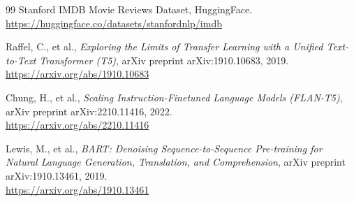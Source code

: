 \begin{thebibliography}{99}
    Stanford IMDB Movie Reviews Dataset, HuggingFace.\\
    \href{https://huggingface.co/datasets/stanfordnlp/imdb}{https://huggingface.co/datasets/stanfordnlp/imdb}

    Raffel, C., et al., \textit{Exploring the Limits of Transfer Learning with a Unified Text-to-Text Transformer (T5)}, arXiv preprint arXiv:1910.10683, 2019.\\
    \href{https://arxiv.org/abs/1910.10683}{https://arxiv.org/abs/1910.10683}

    Chung, H., et al., \textit{Scaling Instruction-Finetuned Language Models (FLAN-T5)}, arXiv preprint arXiv:2210.11416, 2022.\\
    \href{https://arxiv.org/abs/2210.11416}{https://arxiv.org/abs/2210.11416}

    Lewis, M., et al., \textit{BART: Denoising Sequence-to-Sequence Pre-training for Natural Language Generation, Translation, and Comprehension}, arXiv preprint arXiv:1910.13461, 2019.\\
    \href{https://arxiv.org/abs/1910.13461}{https://arxiv.org/abs/1910.13461}

\end{thebibliography}
